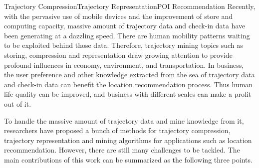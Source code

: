 
\begin{Eabstract}{Trajectory Compression}{Trajectory Representation}{POI Recommendation}{}{}
Recently, with the pervasive use of mobile devices and the improvement of store and computing capacity, massive amount of trajectory data and check-in data have been generating at a dazzling speed. There are human mobility patterns waiting to be exploited behind those data. Therefore, trajectory mining topics such as storing, compression and representation draw growing attention to provide profound influences in economy, environment, and transportation. In business, the user preference and other knowledge extracted from the sea of trajectory data and check-in data can benefit the location recommendation process. Thus human life quality can be improved, and business with different scales can make a profit out of it.




To handle the massive amount of trajectory data and mine knowledge from it, researchers have proposed a bunch of methods for trajectory compression, trajectory representation and mining algorithms for applications such as location recommendation. However, there are still many challenges to be tackled. The main contributions of this work can be summarized as the following three points.




\end{Eabstract}
